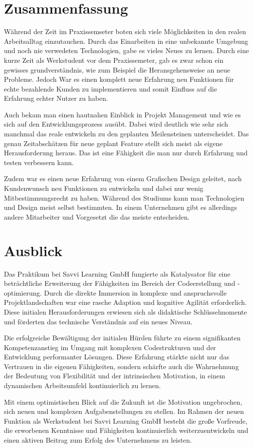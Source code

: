 \chapter{Zusammenfassung}

Während der Zeit im Praxissemseter boten sich viele Möglichkeiten in den realen Arbeitsalltag einzutauchen. Durch das Einarbeiten in eine unbekannte Umgebung und noch nie verwedeten Technologien, gabe es vieles Neues zu lernen. Durch eine kurze Zeit als Werkstudent vor dem Praxissemeter, gab es zwar schon ein gewisses grundverständnis, wie zum Beispiel die Heransgehensweise an neue Probleme. Jedoch War es einen komplett neue Erfahrung neu Funktionen für echte bezahlende Kunden zu implementieren und somit Einfluss auf die Erfahrung echter Nutzer zu haben.

Auch bekam man einen hautnahen Einblick in Projekt Management und wie es sich auf den Entwicklungsprozess ausübt. Dabei wird deutlich wie sehr sich manchmal das reale entwickeln zu den geplanten Meilensteinen unterscheidet. Das genau Zeitabschätzen für neue geplant Feature stellt sich meist als eigene Herausforderung heraus. Das ist eine Fähigkeit die man nur durch Erfahrung und testen verbessern kann.

Zudem war es einen neue Erfahrung von einem Grafischen Design geleitet, nach Kundenwunsch neu Funktionen zu entwickeln und dabei nur wenig {Mitbestimmungsrecht} zu haben. Während des Studiums kann man Technologien und Design meist selbst bestimmten. In einem Unternehmen gibt es allerdings andere Mitarbeiter und Vorgesetzt die das meiste entscheiden.

\chapter{Ausblick}

Das Praktikum bei Savvi Learning GmbH fungierte als Katalysator für eine beträchtliche Erweiterung der Fähigkeiten im Bereich der Codeerstellung und -optimierung. Durch die direkte Immersion in komplexe und anspruchsvolle Projektlandschaften war eine rasche Adaption und kognitive Agilität erforderlich. Diese initialen Herausforderungen erwiesen sich als didaktische Schlüsselmomente und förderten das technische Verständnis auf ein neues Niveau.

Die erfolgreiche Bewältigung der initialen Hürden führte zu einem signifikanten Kompetenzanstieg im Umgang mit komplexen Codestrukturen und der Entwicklung performanter Lösungen. Diese Erfahrung stärkte nicht nur das Vertrauen in die eigenen Fähigkeiten, sondern schärfte auch die Wahrnehmung der Bedeutung von Flexibilität und der intrinsischen Motivation, in einem dynamischen Arbeitsumfeld kontinuierlich zu lernen.

Mit einem optimistischen Blick auf die Zukunft ist die Motivation ungebrochen, sich neuen und komplexen Aufgabenstellungen zu stellen. Im Rahmen der neuen Funktion als Werkstudent bei Savvi Learning GmbH besteht die große Vorfreude, die erworbenen Kenntnisse und Fähigkeiten kontinuierlich weiterzuentwickeln und einen aktiven Beitrag zum Erfolg des Unternehmens zu leisten.